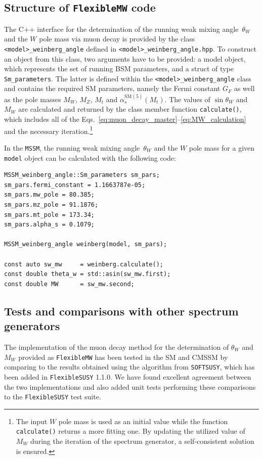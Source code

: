 \documentclass[final,3p,11pt,pdflatex]{elsarticle}
\makeatletter
\newcommand{\modelname}[1]{\texttt{#1}\@\xspace}
\newcommand{\fs}{\texttt{FlexibleSUSY}\@\xspace}
\newcommand{\softsusy}{\texttt{SOFTSUSY}\@\xspace}
\newcommand{\fmw}{\texttt{FlexibleMW}\@\xspace}
\newcommand{\code}[1]{\lstinline|#1|}  %
\newcommand{\SM}{\ensuremath{\text{SM}}\xspace}
\def\as{\alpha_s}
\makeatother
\begin{document}
\subsection{Structure of \fmw code}
%
The C++ interface for the determination of the running weak mixing
angle~$\theta_W$ and the $W$ pole mass via muon decay is provided by the class
\code{<model>_weinberg_angle} defined in
\code{<model>_weinberg_angle.hpp}.  To construct an object from this
class, two arguments have to be provided: a model object, which
represents the set of running BSM parameters, and a struct of type
\code{Sm_parameters}. The latter is defined within the
\code{<model>_weinberg_angle} class and contains the required SM parameters,
namely the Fermi constant $G_F$ as well as the pole
masses $M_W$, $M_Z$, $M_t$ and $\as^{\SM(5)}(M_t)$.
The values of $\sin\theta_W$ and $M_W$ are calculated and returned by
the class member function \code{calculate()}, which includes all of the
Eqs.~\eqref{eq:muon_decay_master}--\eqref{eq:MW_calculation} and the
necessary iteration.\footnote{The input $W$ pole mass is used as an
initial value while the function \code{calculate()} returns a more fitting
one. By updating the utilized value of $M_W$ during the iteration of the
spectrum generator, a self-consistent solution is ensured.}
%
\begin{example}
  In the \modelname{MSSM}, the running weak mixing angle~$\theta_W$ and the
  $W$ pole mass for a given \code{model} object can be calculated with
  the following code:
%
\begin{lstlisting}
MSSM_weinberg_angle::Sm_parameters sm_pars;
sm_pars.fermi_constant = 1.1663787e-05;
sm_pars.mw_pole = 80.385;
sm_pars.mz_pole = 91.1876;
sm_pars.mt_pole = 173.34;
sm_pars.alpha_s = 0.1079;

MSSM_weinberg_angle weinberg(model, sm_pars);

const auto sw_mw     = weinberg.calculate();
const double theta_w = std::asin(sw_mw.first);
const double MW      = sw_mw.second;
\end{lstlisting}
\end{example}
%

\subsection{Tests and comparisons with other spectrum generators}
%
The implementation of the muon decay method for the determination
of $\theta_W$ and $M_W$ provided as \fmw has been tested in the SM
and CMSSM by comparing to the results obtained using the algorithm
from \softsusy, which has been added in \fs 1.1.0. We have found
excellent agreement between the two implementations and also added
unit tests performing these comparisons to the \fs test suite.
\end{document}
